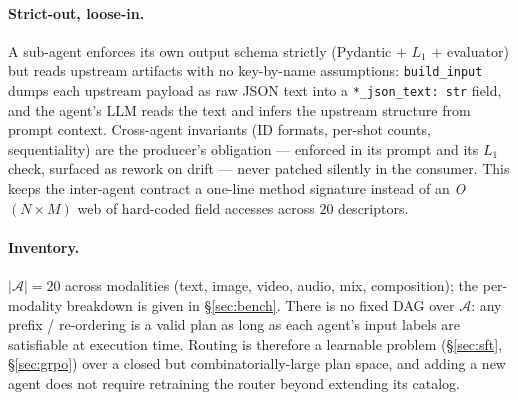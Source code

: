 \paragraph{Strict-out, loose-in.}
A sub-agent enforces its own output schema strictly (Pydantic $+$ $L_1$
$+$ evaluator) but reads upstream artifacts with no key-by-name
assumptions: \texttt{build\_input} dumps each upstream payload as raw
JSON text into a \texttt{*\_json\_text:\,str} field, and the agent's
LLM reads the text and infers the upstream structure from prompt
context. Cross-agent invariants (ID formats, per-shot counts,
sequentiality) are the producer's obligation --- enforced in its
prompt and its $L_1$ check, surfaced as rework on drift --- never
patched silently in the consumer. This keeps the inter-agent contract
a one-line method signature instead of an
\textit{O}$(N\!\times\!M)$ web of hard-coded field accesses across $20$
descriptors.

\paragraph{Inventory.}
$|\mathcal{A}|\!=\!20$ across modalities (text, image, video, audio,
mix, composition); the per-modality breakdown is given in
\S\ref{sec:bench}. There is no fixed DAG over $\mathcal{A}$: any
prefix / re-ordering is a valid plan as long as each agent's input
labels are satisfiable at execution time. Routing is therefore a
learnable problem (\S\ref{sec:sft}, \S\ref{sec:grpo}) over a closed
but combinatorially-large plan space, and adding a new agent does not
require retraining the router beyond extending its catalog.
